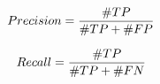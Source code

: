 \begin{equation} \label{eq:precision}
\centering
Precision = \frac{\#TP}{\#TP + \#FP}
\end{equation}

\begin{equation} \label{eq:recall}
\centering
Recall = \frac{\#TP}{\#TP + \#FN}
\end{equation}





